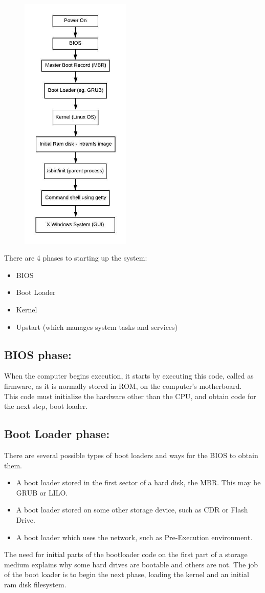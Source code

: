 \documentclass[]{report}
\begin{document}
\begin{figure}[H]
	\vspace{0pt}
	\includegraphics[height = 350pt, keepaspectratio]{linux_booting.jpeg}
\end{figure}


\large
There are 4 phases to starting up the system:
\begin{itemize}
	\item BIOS
	\item Boot Loader
	\item Kernel
	\item Upstart (which manages system tasks and services)
\end{itemize}
\subsection{BIOS phase:}
When the computer begins execution, it starts by executing this code, called as firmware, as it is normally stored in ROM, on the computer's motherboard. \\
This code must initialize the hardware other than the CPU, and obtain code for the next step, boot loader.
\subsection{Boot Loader phase:}
There are several possible types of boot loaders and ways for the BIOS to obtain them.
\begin{itemize}
	\item A boot loader stored in the first sector of a hard disk, the MBR. This may be GRUB or LILO.
	\item A boot loader stored on some other storage device, such as CDR or Flash Drive.
	\item A boot loader which uses the network, such as Pre-Execution environment.
\end{itemize}
The need for initial parts of the bootloader code on the first part of a storage medium explains why some hard drives are bootable and others are not. The job of the boot loader is to begin the next phase, loading the kernel and an initial ram disk filesystem.
\end{document}
